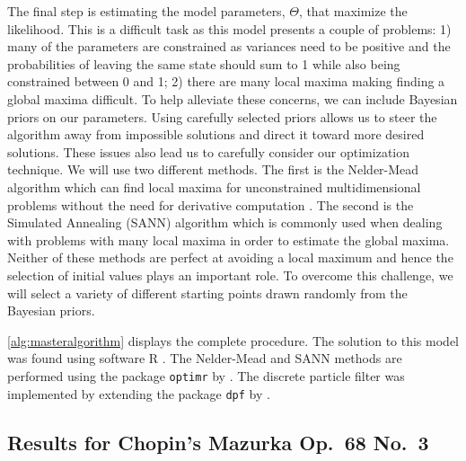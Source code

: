 \documentclass[12pt]{article}
\begin{document}
The final step is estimating the model parameters, \(\Theta\), that
maximize the likelihood. This is a difficult task as this model presents
a couple of problems: 1) many of the parameters are constrained as
variances need to be positive and the probabilities of leaving the same
state should sum to 1 while also being constrained between 0 and 1; 2)
there are many local maxima making finding a global maxima difficult. To
help alleviate these concerns, we can include Bayesian priors on our
parameters. Using carefully selected priors allows us to steer the
algorithm away from impossible solutions and direct it toward more
desired solutions. These issues also lead us to carefully consider our
optimization technique. We will use two different methods. The first is
the Nelder-Mead algorithm which can find local maxima for unconstrained
multidimensional problems without the need for derivative computation
\citep{nelder_simplex_1965}. The second is the Simulated Annealing
(SANN) algorithm which is commonly used when dealing with problems with
many local maxima in order to estimate the global maxima. Neither of
these methods are perfect at avoiding a local maximum and hence the
selection of initial values plays an important role. To overcome this
challenge, we will select a variety of different starting points drawn
randomly from the Bayesian priors.

\vspace{10px}

\autoref{alg:masteralgorithm} displays the complete procedure. The
solution to this model was found using software R
\citep{r_core_team_r_2019}. The Nelder-Mead and SANN methods are
performed using the package \texttt{optimr} by \cite{nash_optimr_2019}.
The discrete particle filter was implemented by extending the package
\texttt{dpf} by \cite{mcdonald_dpf_2020}.

\subsection{Results for Chopin's Mazurka Op.\ 68 No.\ 3}
\end{document}
